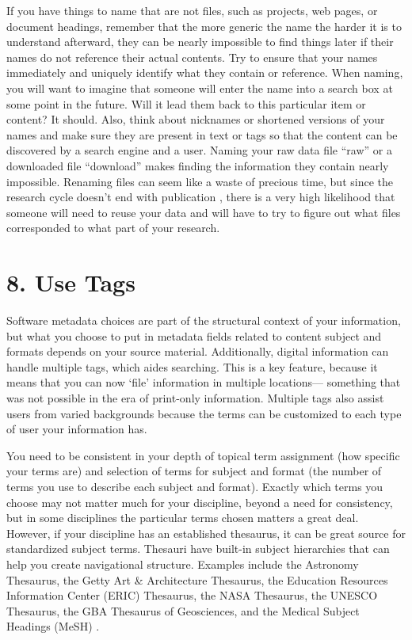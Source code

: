 \documentclass[10pt,letterpaper]{article}
\newcommand{\rulemajor}[1]{\section*{#1}}
\begin{document}
If you have things to name that are not files, such as projects, web pages, or
document headings, remember that the more generic the name the harder it is to
understand afterward, they can be nearly impossible to find things later if
their names do not reference their actual contents.  Try to ensure that your
names immediately and uniquely identify what they contain or reference. When
naming, you will want to imagine that someone will enter the name into a search
box at some point in the future. Will it lead them back to this particular item
or content? It should. Also, think about nicknames or shortened versions of your
names and make sure they are present in text or tags so that the content can be
discovered by a search engine and a user. Naming your raw data file ``raw'' or a
downloaded file ``download'' makes finding the information they contain nearly
impossible.  Renaming files can seem like a waste of precious time, but since
the research cycle doesn't end with publication \cite{Briney2015}, there is a
very high likelihood that someone will need to reuse your data and will have to
try to figure out what files corresponded to what part of your research.

\rulemajor{8. Use Tags}

Software metadata choices are part of the structural context of your
information, but what you choose to put in metadata fields related to content
subject and formats depends on your source material.  Additionally, digital
information can handle multiple tags, which aides searching.  This is a key
feature, because it means that you can now `file' information in multiple
locations--- something that was not possible in the era of print-only
information. Multiple tags also assist users from varied backgrounds because the
terms can be customized to each type of user your information has.

You need to be consistent in your depth of topical term assignment (how specific
your terms are) and selection of terms for subject and format (the number of
terms you use to describe each subject and format). Exactly which terms you
choose may not matter much for your discipline, beyond a need for consistency,
but in some disciplines the particular terms chosen matters a great
deal. However, if your discipline has an established thesaurus, it can be great
source for standardized subject terms. Thesauri have built-in subject
hierarchies that can help you create navigational structure. Examples include
the Astronomy Thesaurus, the Getty Art \& Architecture Thesaurus, the Education
Resources Information Center (ERIC) Thesaurus, the NASA Thesaurus, the UNESCO
Thesaurus, the GBA Thesaurus of Geosciences, and the Medical Subject Headings
(MeSH) \cite{ASI2020}.
\end{document}
